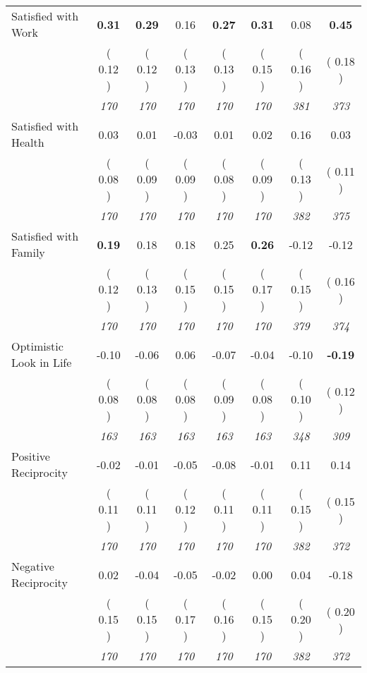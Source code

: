\begin{tabular}{l c c c c c c c}
Satisfied with Work & \textbf{      0.31 } & \textbf{      0.29 } &      0.16 & \textbf{     0.27} & \textbf{     0.31} &      0.08 & \textbf{      0.45 } \\
& (     0.12 ) & (     0.12 ) & (     0.13 ) & (     0.13 ) & (     0.15 ) & (     0.16 ) & (     0.18 ) \\
& \textit{ 170 } & \textit{ 170 } & \textit{ 170 } & \textit{ 170 } & \textit{ 170 } & \textit{ 381 } & \textit{ 373 } \\
Satisfied with Health &      0.03 &      0.01 &     -0.03 &      0.01 &      0.02 &      0.16 &      0.03 \\
& (     0.08 ) & (     0.09 ) & (     0.09 ) & (     0.08 ) & (     0.09 ) & (     0.13 ) & (     0.11 ) \\
& \textit{ 170 } & \textit{ 170 } & \textit{ 170 } & \textit{ 170 } & \textit{ 170 } & \textit{ 382 } & \textit{ 375 } \\
Satisfied with Family & \textbf{      0.19 } &      0.18 &      0.18 &      0.25 & \textbf{     0.26} &     -0.12 &     -0.12 \\
& (     0.12 ) & (     0.13 ) & (     0.15 ) & (     0.15 ) & (     0.17 ) & (     0.15 ) & (     0.16 ) \\
& \textit{ 170 } & \textit{ 170 } & \textit{ 170 } & \textit{ 170 } & \textit{ 170 } & \textit{ 379 } & \textit{ 374 } \\
Optimistic Look in Life &     -0.10 &     -0.06 &      0.06 &     -0.07 &     -0.04 &     -0.10 & \textbf{     -0.19 } \\
& (     0.08 ) & (     0.08 ) & (     0.08 ) & (     0.09 ) & (     0.08 ) & (     0.10 ) & (     0.12 ) \\
& \textit{ 163 } & \textit{ 163 } & \textit{ 163 } & \textit{ 163 } & \textit{ 163 } & \textit{ 348 } & \textit{ 309 } \\
Positive Reciprocity &     -0.02 &     -0.01 &     -0.05 &     -0.08 &     -0.01 &      0.11 &      0.14 \\
& (     0.11 ) & (     0.11 ) & (     0.12 ) & (     0.11 ) & (     0.11 ) & (     0.15 ) & (     0.15 ) \\
& \textit{ 170 } & \textit{ 170 } & \textit{ 170 } & \textit{ 170 } & \textit{ 170 } & \textit{ 382 } & \textit{ 372 } \\
Negative Reciprocity &      0.02 &     -0.04 &     -0.05 &     -0.02 &      0.00 &      0.04 &     -0.18 \\
& (     0.15 ) & (     0.15 ) & (     0.17 ) & (     0.16 ) & (     0.15 ) & (     0.20 ) & (     0.20 ) \\
& \textit{ 170 } & \textit{ 170 } & \textit{ 170 } & \textit{ 170 } & \textit{ 170 } & \textit{ 382 } & \textit{ 372 } \\
\bottomrule
\end{tabular}

